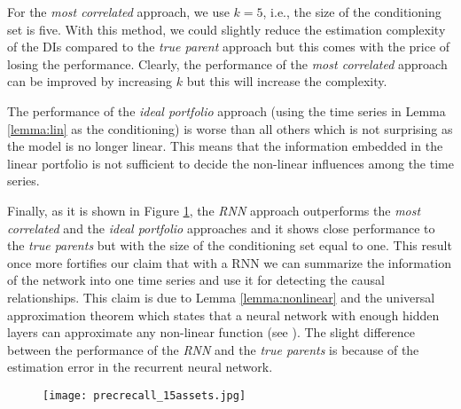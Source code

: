 For the \textit{most correlated} approach, we use $k=5$, i.e., the size of the conditioning set is five.
With this method, we could slightly reduce the estimation complexity of the DIs compared to the  \textit{true parent} approach but this comes with the price of losing the performance.
Clearly, the performance of the \textit{most correlated} approach can be improved by increasing $k$ but this will increase the complexity.

The performance of the \textit{ideal portfolio} approach (using the time series in Lemma \ref{lemma:lin} as the conditioning) is worse than all others which is not surprising as the model is no longer linear. 
This means that the information embedded in the linear portfolio is not sufficient to decide the non-linear influences among the time series. 

Finally, as it is shown in Figure \ref{fig:perfnonlin}, the \textit{RNN} approach outperforms the \textit{most correlated} and the \textit{ideal portfolio} approaches and it shows close performance to the \textit{true parents} but with the size of the conditioning set equal to one. 
This result once more fortifies our claim that with a RNN we can summarize the information of the network into one time series and use it for detecting the causal relationships. 
This claim is due to Lemma \ref{lemma:nonlinear} and the universal approximation theorem which states that a neural network with enough hidden layers can approximate any non-linear function (see \citet{HORNIK1989359}).
The slight difference between the performance of the \textit{RNN} and the \textit{true parents} is because of the estimation error in the recurrent neural network. 


\begin{figure}[h]
\centering
\texttt{[image: precrecall\_15assets.jpg]}
\label{fig:perfnonlin}
\end{figure}

